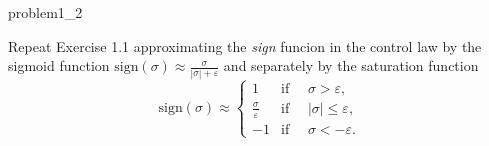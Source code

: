 \begin{problem}{1.2}{problem1_2}

Repeat Exercise 1.1 approximating the \textit{sign} funcion in the control law by the sigmoid function $\text{sign}(\sigma) \approx \frac{\sigma}{|\sigma| + \varepsilon}$ and separately by the saturation function
\[
	\text{sign}(\sigma) \approx
	\begin{cases}
		1                          & \text{if } \quad \sigma > \varepsilon,       \\
		\frac{\sigma}{\varepsilon} & \text{if } \quad  |\sigma| \leq \varepsilon, \\
		-1                         & \text{if } \quad  \sigma < -\varepsilon.
	\end{cases}
\]

\end{problem}

